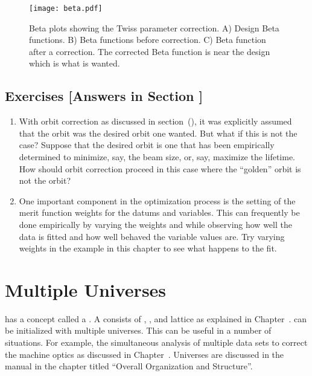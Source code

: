 \documentclass{hitec}     %
\newcommand{\Section}[1]{\section{#1}\vspace*{-1ex}}
\begin{document}
{\begin{figure}[tb]
  \centering
  \texttt{[image: beta.pdf]}
  \caption{Beta plots showing the Twiss parameter correction. A) Design Beta functions. B)
Beta functions before correction. C) Beta function after a correction. The corrected Beta function
is near the design which is what is wanted.}
  \label{f:beta}
\end{figure}


\subsection{Exercises [Answers in Section ]}
\label{s:opt.corr.ex}

\begin{enumerate}[label=\thesection.\arabic{enumi}]
\item
With orbit correction as discussed in section~(), it was explicitly assumed that
the  orbit was the desired orbit one wanted. But what if this is not the case? Suppose
that the desired orbit is one that has been empirically determined to minimize, say, the beam size,
or, say, maximize the lifetime. How should orbit correction proceed in this case where the
``golden'' orbit is not the  orbit?
%
\item
One important component in the optimization process is the setting of the merit function weights for
the datums and variables. This can frequently be done empirically by varying the weights and while
observing how well the data is fitted and how well behaved the variable values are. Try varying
weights in the example in this chapter to see what happens to the fit.
\end{enumerate}

\newpage

\Section{Multiple Universes}
\label{s:multi.uni}

\tao has a concept called a . A  consists of , , and
 lattice as explained in Chapter~. \tao can be initialized with multiple
universes. This can be useful in a number of situations. For example, the simultaneous analysis of
multiple data sets to correct the machine optics as discussed in Chapter~.
Universes are discussed in the \tao manual in the chapter titled ``Overall Organization and Structure''.

}
\end{document}
